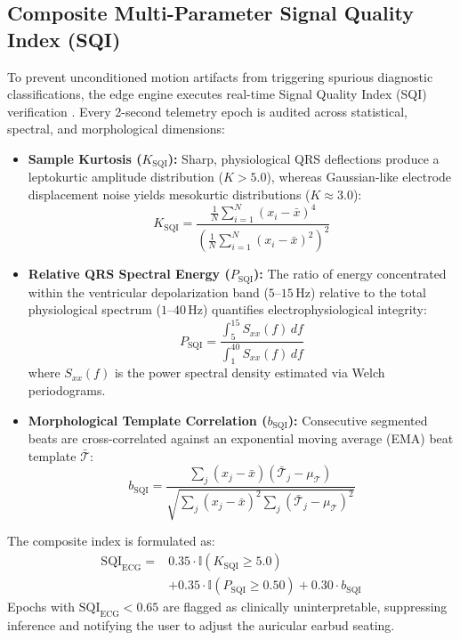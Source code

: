 \subsection{Composite Multi-Parameter Signal Quality Index (SQI)}
To prevent unconditioned motion artifacts from triggering spurious diagnostic classifications, the edge engine executes real-time Signal Quality Index (SQI) verification \cite{Clifford2012}. Every 2-second telemetry epoch is audited across statistical, spectral, and morphological dimensions:
\begin{itemize}
    \item \textbf{Sample Kurtosis ($K_{\text{SQI}}$):} Sharp, physiological QRS deflections produce a leptokurtic amplitude distribution ($K > 5.0$), whereas Gaussian-like electrode displacement noise yields mesokurtic distributions ($K \approx 3.0$):
    \begin{equation}
        K_{\text{SQI}} = \frac{\frac{1}{N}\sum_{i=1}^N (x_i - \bar{x})^4}{\left(\frac{1}{N}\sum_{i=1}^N (x_i - \bar{x})^2\right)^2}
    \end{equation}
    \item \textbf{Relative QRS Spectral Energy ($P_{\text{SQI}}$):} The ratio of energy concentrated within the ventricular depolarization band ($5$--$15$\,Hz) relative to the total physiological spectrum ($1$--$40$\,Hz) quantifies electrophysiological integrity:
    \begin{equation}
        P_{\text{SQI}} = \frac{\int_{5}^{15} S_{xx}(f) \, df}{\int_{1}^{40} S_{xx}(f) \, df}
    \end{equation}
    where $S_{xx}(f)$ is the power spectral density estimated via Welch periodograms.
    \item \textbf{Morphological Template Correlation ($b_{\text{SQI}}$):} Consecutive segmented beats are cross-correlated against an exponential moving average (EMA) beat template $\bar{\mathcal{T}}$:
    \begin{equation}
        b_{\text{SQI}} = \frac{\sum_{j} (x_j - \bar{x})(\bar{\mathcal{T}}_j - \mu_{\mathcal{T}})}{\sqrt{\sum_j (x_j - \bar{x})^2 \sum_j (\bar{\mathcal{T}}_j - \mu_{\mathcal{T}})^2}}
    \end{equation}
\end{itemize}

The composite index is formulated as:
\begin{align}
    \text{SQI}_{\text{ECG}} = & 0.35 \cdot \mathbb{I}(K_{\text{SQI}} \ge 5.0) \nonumber \\
    & + 0.35 \cdot \mathbb{I}(P_{\text{SQI}} \ge 0.50) + 0.30 \cdot b_{\text{SQI}}
\end{align}
Epochs with $\text{SQI}_{\text{ECG}} < 0.65$ are flagged as clinically uninterpretable, suppressing inference and notifying the user to adjust the auricular earbud seating.

